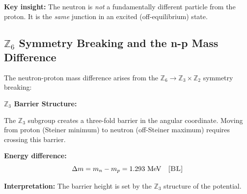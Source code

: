 \documentclass[11pt,a4paper]{article}
\newcommand{\tagBL}{\textcolor{gray!70!black}{\textbf{[BL]}}}
\begin{document}
\begin{center}
\end{center}

\textbf{Key insight:} The neutron is \emph{not} a fundamentally different particle from the proton. It is the \emph{same} junction in an excited (off-equilibrium) state.

\subsection{$\mathbb{Z}_6$ Symmetry Breaking and the n-p Mass Difference}

The neutron-proton mass difference arises from the $\mathbb{Z}_6 \to \mathbb{Z}_3 \times \mathbb{Z}_2$ symmetry breaking:

\begin{derivbox}
\textbf{$\mathbb{Z}_3$ Barrier Structure:}

The $\mathbb{Z}_3$ subgroup creates a three-fold barrier in the angular coordinate. Moving from proton (Steiner minimum) to neutron (off-Steiner maximum) requires crossing this barrier.

\textbf{Energy difference:}
\begin{equation}
    \Delta m = m_n - m_p = 1.293 \text{ MeV} \quad \tagBL{}
\end{equation}

\textbf{Interpretation:} The barrier height is set by the $\mathbb{Z}_3$ structure of the potential.
\end{derivbox}
\end{document}
